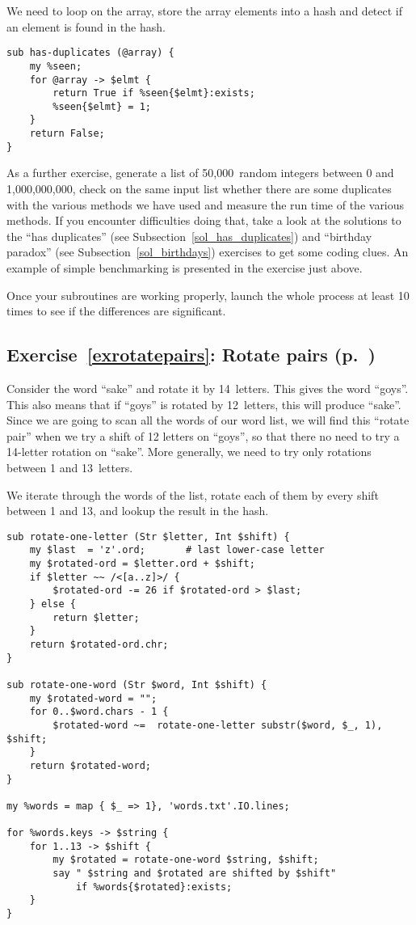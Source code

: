 We need to loop on the array, store the array elements into 
a hash and detect if an element is found in the hash.

\begin{verbatim}
sub has-duplicates (@array) {
    my %seen;
    for @array -> $elmt {
        return True if %seen{$elmt}:exists;
        %seen{$elmt} = 1;
    }
    return False;
}
\end{verbatim}

As a further exercise, generate a list of 50,000~random 
integers between 0 and 1,000,000,000, check on the same 
input list whether there are some duplicates with the 
various methods we have used and measure the run time of 
the various methods. If you encounter difficulties doing 
that, take a look at the solutions to the ``has duplicates'' 
(see Subsection~\ref{sol_has_duplicates}) and ``birthday paradox'' (see 
Subsection~\ref{sol_birthdays}) exercises to get some coding clues. An 
example of simple benchmarking is presented in the exercise just 
above.

Once your subroutines are working properly, launch the 
whole process at least 10 times to see if the differences 
are significant.

\subsection{Exercise~\ref{exrotatepairs}: Rotate pairs (p.~\pageref{exrotatepairs})}
\label{sol_exrotatepairs}

Consider the word ``sake'' and rotate it by 14~letters. This gives the word ``goys''. This also means that if ``goys'' 
is rotated by 12~letters, this will produce ``sake''. Since 
we are going to scan all the words of our word list, we will 
find this ``rotate pair'' when we try a shift of 12 letters 
on ``goys'', so that there no need to try a 14-letter rotation 
on ``sake''. More generally, we need to try only rotations 
between 1 and 13~letters. 

We iterate through the words of the list, rotate each of 
them by every shift between 1 and 13, and lookup the result 
in the hash.

\begin{verbatim}
sub rotate-one-letter (Str $letter, Int $shift) {
    my $last  = 'z'.ord;       # last lower-case letter
    my $rotated-ord = $letter.ord + $shift;
    if $letter ~~ /<[a..z]>/ { 
        $rotated-ord -= 26 if $rotated-ord > $last;
    } else {
        return $letter;
    }
    return $rotated-ord.chr;
}

sub rotate-one-word (Str $word, Int $shift) {
    my $rotated-word = "";
    for 0..$word.chars - 1 {
        $rotated-word ~=  rotate-one-letter substr($word, $_, 1), $shift;
    }
    return $rotated-word;
}

my %words = map { $_ => 1}, 'words.txt'.IO.lines;

for %words.keys -> $string {
    for 1..13 -> $shift {
        my $rotated = rotate-one-word $string, $shift;
        say " $string and $rotated are shifted by $shift"
            if %words{$rotated}:exists;
    }
}
\end{verbatim}

